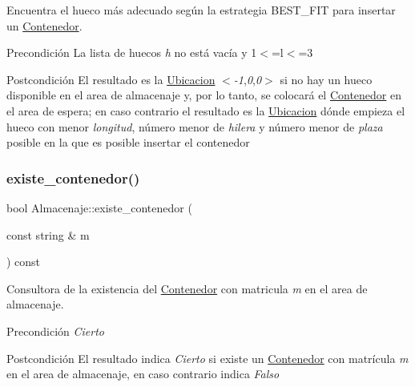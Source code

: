 Encuentra el hueco más adecuado según la estrategia B\+E\+S\+T\+\_\+\+F\+IT para insertar un \hyperlink{class_contenedor}{Contenedor}. 

\begin{DoxyPrecond}{Precondición}
La lista de huecos {\itshape h} no está vacía y 1$<$=l$<$=3 
\end{DoxyPrecond}
\begin{DoxyPostcond}{Postcondición}
El resultado es la \hyperlink{class_ubicacion}{Ubicacion} $<${\itshape -\/1},{\itshape 0},{\itshape 0}$>$ si no hay un hueco disponible en el area de almacenaje y, por lo tanto, se colocará el \hyperlink{class_contenedor}{Contenedor} en el area de espera; en caso contrario el resultado es la \hyperlink{class_ubicacion}{Ubicacion} dónde empieza el hueco con menor {\itshape longitud}, número menor de {\itshape hilera} y número menor de {\itshape plaza} posible en la que es posible insertar el contenedor 
\end{DoxyPostcond}
\mbox{\label{class_almacenaje_aa846d1cf215bd139527d2607d4cee833}} 
\subsubsection{\texorpdfstring{existe\+\_\+contenedor()}{existe\_contenedor()}}
{\footnotesize\ttfamily bool Almacenaje\+::existe\+\_\+contenedor (\begin{DoxyParamCaption}\item[{const string \&}]{m }\end{DoxyParamCaption}) const}



Consultora de la existencia del \hyperlink{class_contenedor}{Contenedor} con matricula {\itshape m} en el area de almacenaje. 

\begin{DoxyPrecond}{Precondición}
{\itshape Cierto} 
\end{DoxyPrecond}
\begin{DoxyPostcond}{Postcondición}
El resultado indica {\itshape Cierto} si existe un \hyperlink{class_contenedor}{Contenedor} con matrícula {\itshape m} en el area de almacenaje, en caso contrario indica {\itshape Falso} 
\end{DoxyPostcond}
\mbox{\label{class_almacenaje_a5de7fa3a41e402feecac670c226a058f}} 
